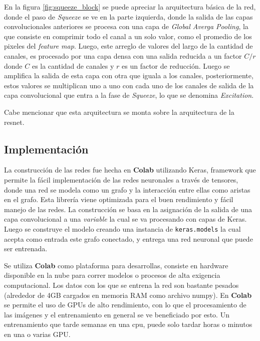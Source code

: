         En la figura \ref{fig:squeeze_block} se puede apreciar la arquitectura básica de la red, donde el paso de \textit{Squeeze} se ve en la parte izquierda, donde la salida de las capas convolucionales anteriores se procesa con una capa de \textit{Global Averga Pooling}, la que consiste en comprimir todo el canal a un solo valor, como el promedio de los pixeles del \textit{feature map}. Luego, este arreglo de valores del largo de la cantidad de canales, es procesado por una capa densa con una salida reducida a un factor $C / r$ donde $C$ es la cantidad de canales y $r$ es un factor de reducción. Luego se amplifica la salida de esta capa con otra que iguala a los canales, posteriormente, estos valores se multiplican uno a uno con cada uno de los canales de salida de la capa convolucional que entra a la fase de \textit{Squeeze}, lo que se denomina \textit{Excitation}.
        
        Cabe mencionar que esta arquitectura se monta sobre la arquitectura de la resnet.

    \subsection{Implementación}

        La construcción de las redes fue hecha en \textbf{Colab} utilizando Keras, framework que permite la fácil implementación de las redes neuronales a través de tensores, donde una red se modela como un grafo y la interacción entre ellas como aristas en el grafo. Esta librería viene optimizada para el buen rendimiento y fácil manejo de las redes. La construcción se basa en la asignación de la salida de una capa convolucional a una \textit{variable} la cual se va procesando con capas de Keras. Luego se construye el modelo creando una instancia de \texttt{keras.models} la cual acepta como entrada este grafo conectado, y entrega una red neuronal que puede ser entrenada.
        
        Se utiliza \textbf{Colab} como plataforma para desarrollas, consiste en hardware disponible en la nube para correr modelos o procesos de alta exigencia computacional. Los datos con los que se entrena la red son bastante pesados (alrededor de 4GB cargados en memoria RAM como archivo numpy). En \textbf{Colab} se permite el uso de GPUs de alto rendimiento, con lo que el procesamiento de las imágenes y el entrenamiento en general se ve beneficiado por esto. Un entrenamiento que tarde semanas en una cpu, puede solo tardar horas o minutos en una o varias GPU.
        
